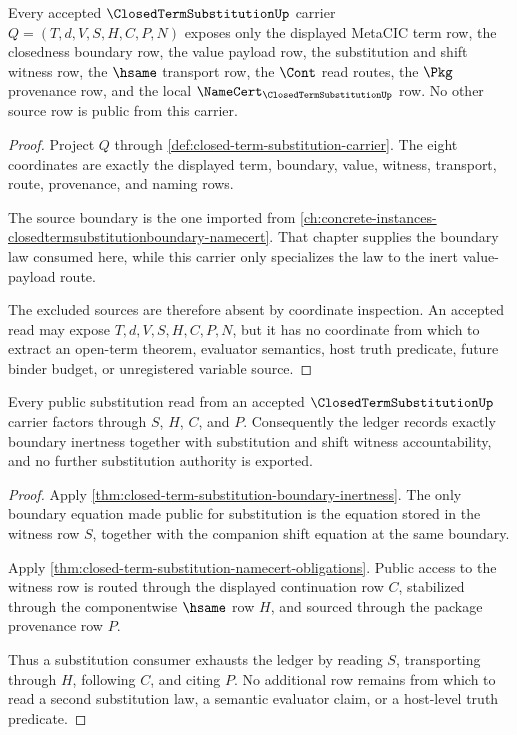 \begin{theorem}
\label{thm:closed-substitution-source-boundary}
Every accepted $\ClosedTermSubstitutionUp$ carrier $Q=(T,d,V,S,H,C,P,N)$ exposes only the displayed MetaCIC term row, the closedness boundary row, the value payload row, the substitution and shift witness row, the $\hsame$ transport row, the $\Cont$ read routes, the $\Pkg$ provenance row, and the local $\NameCert_{\ClosedTermSubstitutionUp}$ row. No other source row is public from this carrier.
\end{theorem}
\begin{proof}
Project $Q$ through \autoref{def:closed-term-substitution-carrier}. The eight coordinates are exactly the displayed term, boundary, value, witness, transport, route, provenance, and naming rows.

The source boundary is the one imported from \autoref{ch:concrete-instances-closedtermsubstitutionboundary-namecert}. That chapter supplies the boundary law consumed here, while this carrier only specializes the law to the inert value-payload route.

The excluded sources are therefore absent by coordinate inspection. An accepted read may expose $T,d,V,S,H,C,P,N$, but it has no coordinate from which to extract an open-term theorem, evaluator semantics, host truth predicate, future binder budget, or unregistered variable source.
\end{proof}

\begin{theorem}
\label{thm:closed-substitution-substitution-ledger-exhaustion}
Every public substitution read from an accepted $\ClosedTermSubstitutionUp$ carrier factors through $S$, $H$, $C$, and $P$. Consequently the ledger records exactly boundary inertness together with substitution and shift witness accountability, and no further substitution authority is exported.
\end{theorem}
\begin{proof}
Apply \autoref{thm:closed-term-substitution-boundary-inertness}. The only boundary equation made public for substitution is the equation stored in the witness row $S$, together with the companion shift equation at the same boundary.

Apply \autoref{thm:closed-term-substitution-namecert-obligations}. Public access to the witness row is routed through the displayed continuation row $C$, stabilized through the componentwise $\hsame$ row $H$, and sourced through the package provenance row $P$.

Thus a substitution consumer exhausts the ledger by reading $S$, transporting through $H$, following $C$, and citing $P$. No additional row remains from which to read a second substitution law, a semantic evaluator claim, or a host-level truth predicate.
\end{proof}

